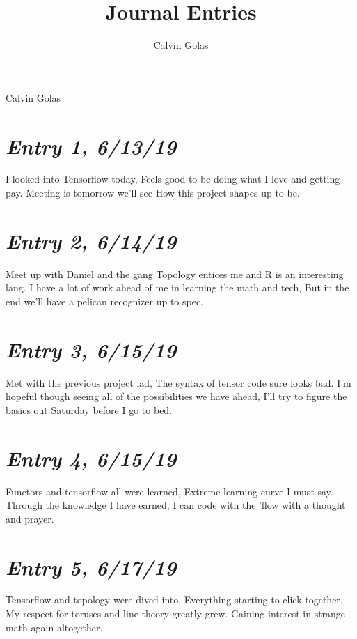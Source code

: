 \documentclass{article}
\author{Calvin Golas}
\title{Journal Entries}
\begin{document}
{\Large Calvin Golas}\\

\section{\Large \itshape  Entry 1, 6/13/19}
    I looked into Tensorflow today,
\newline
Feels good to be doing what I love and getting pay.
\newline
Meeting is tomorrow we'll see
\newline
How this project shapes up to be.

\section{\Large \itshape  Entry 2, 6/14/19}
    Meet up with Daniel and the gang
\newline
Topology entices me and R is an interesting lang.
\newline
I have a lot of work ahead of me in learning the math and tech,
\newline
But in the end we'll have a pelican recognizer up to spec.
\newline


\section{\Large \itshape  Entry 3, 6/15/19}
    Met with the previous project lad,
\newline
The syntax of tensor code sure looks bad.
\newline
I'm hopeful though seeing all of the possibilities we have ahead,
\newline
I'll try to figure the basics out Saturday before I go to bed.

\section{\Large \itshape  Entry 4, 6/15/19}
    Functors and tensorflow all were learned,
\newline
Extreme learning curve I must say.
\newline
Through the knowledge I have earned,
\newline
I can code with the 'flow with a thought and prayer.

\section{\Large \itshape  Entry 5, 6/17/19}
    Tensorflow and topology were dived into,
\newline
Everything starting to click together.
\newline
My respect for toruses and line theory greatly grew.
\newline
Gaining interest in strange math again altogether.
\end{document}
